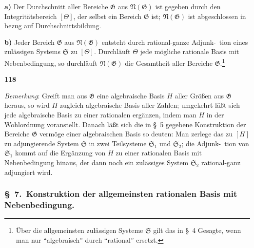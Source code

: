 \documentclass[12pt,a4paper]{article}
\begin{document}
\smallskip
\textbf{a)} Der Durchschnitt aller Bereiche $\mathfrak{G}$ aus $\mathfrak{N}(\mathfrak{G})$ ist gegeben durch den Integrit\"atsbereich $[\Theta]$, der selbst ein Bereich $\mathfrak{G}$ ist; $\mathfrak{N}(\mathfrak{G})$ ist abgeschlossen in bezug auf Durchschnittsbildung.

\smallskip
\textbf{b)} Jeder Bereich $\mathfrak{G}$ aus $\mathfrak{N}(\mathfrak{G})$ entsteht durch rational-ganze Adjunk-\ tion eines zul\"assigen Systems $\mathfrak{S}$ zu $[\Theta]$. Durchl\"auft $\Theta$ jede m\"ogliche rationale Basis mit Nebenbedingung, so durchl\"auft $\mathfrak{N}(\mathfrak{G})$ die Gesamtheit aller Bereiche $\mathfrak{G}$.\footnote{\"Uber die allgemeinsten zul\"assigen Systeme $\mathfrak{S}$ gilt das in \S\ 4 Gesagte, wenn man nur ``algebraisch'' durch ``rational'' ersetzt.}

\newpage
\begin{center}
\textbf{118}
\end{center}

\emph{Bemerkung}: Greift man aus $\mathfrak{G}$ eine algebraische Basis $H$ aller Gr\"o\ss en aus $\mathfrak{G}$ heraus, so wird $H$ zugleich algebraische Basis aller Zahlen; umgekehrt l\"a\ss t sich jede algebraische Basis zu einer rationalen erg\"anzen, indem man $H$ in der Wohlordnung voranstellt. Danach l\"a\ss t sich die in \S\ 5 gegebene Konstruktion der Bereiche $\mathfrak{G}$ verm\"oge einer algebraischen Basis so deuten: Man zerlege das zu $[H]$ zu adjungierende System $\mathfrak{S}$ in zwei Teilsysteme $\mathfrak{S}_1$ und $\mathfrak{S}_2$; die Adjunk-\ tion von $\mathfrak{S}_1$ kommt auf die Erg\"anzung von $H$ zu einer rationalen Basis mit Nebenbedingung hinaus, der dann noch ein zul\"assiges System $\mathfrak{S}_2$ rational-ganz adjungiert wird.

\subsubsection*{\S\ 7.\ Konstruktion der allgemeinsten rationalen Basis mit Nebenbedingung.}
\end{document}
